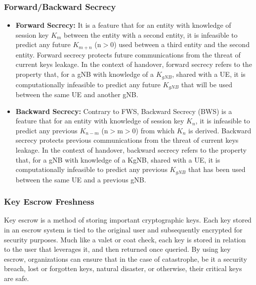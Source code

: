 {{        \subsubsection{Forward/Backward Secrecy}{
            \begin{itemize}
                \item \textbf{Forward Secrecy: } It is a feature
                that for an entity with knowledge of session key \(K_m\) between
                the entity with a second entity, it is infeasible to predict
                any future \(K_{m+n}\) (n$>$0) used between a third entity and the
                second entity. Forward secrecy protects future communications
                from the threat of current keys leakage. In the context of
                handover, forward secrecy refers to the property that, for a
                gNB with knowledge of a \(K_{gNB}\), shared with a UE, it is
                computationally infeasible to predict any future \(K_{gNB}\) that
                will be used between the same UE and another gNB.

                \item \textbf{Backward Secrecy: }{
                    Contrary to FWS, Backward Secrecy
                    (BWS) is a feature that for an entity with knowledge of
                    session key \(K_n\), it is infeasible to predict any previous \(K_{n-m}\)
                    (n$>$m$>$0) from which \(K_n\) is derived. Backward secrecy
                    protects previous communications from the threat of current
                    keys leakage. In the context of handover, backward secrecy
                    refers to the property that, for a gNB with knowledge of a
                    KgNB, shared with a UE, it is computationally infeasible to
                    predict any previous \(K_{gNB}\) that has been used between the
                    same UE and a previous gNB.
                }
            \end{itemize}
        }

        \subsubsection{Key Escrow Freshness}{
            Key escrow is a method of storing important cryptographic keys. Each key stored in an escrow system is tied to the original user and subsequently encrypted for security purposes. Much like a valet or coat check, each key is stored in relation to the user that leverages it, and then returned once queried. By using key escrow, organizations can ensure that in the case of catastrophe, be it a security breach, lost or forgotten keys, natural disaster, or otherwise, their critical keys are safe.
        }
}}
